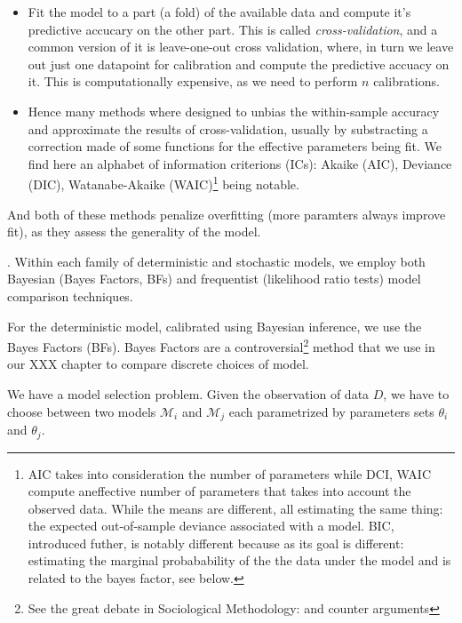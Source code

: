 \begin{itemize}
	\item Fit the model to a part (a fold) of the available data and compute it’s predictive accucary on the other part. This is called \emph{cross-validation}, and a common version of it is leave-one-out cross validation, where, in turn we leave out just one datapoint for calibration and compute the predictive accuacy on it. This is computationally expensive, as we need to perform $n$ calibrations.
	\item Hence many methods where designed to unbias the within-sample accuracy and approximate the results of cross-validation, usually by substracting  a correction made of some functions for the effective parameters being fit. We find here an alphabet of information criterions (ICs):  Akaike (AIC), Deviance  (DIC), Watanabe-Akaike (WAIC)\footnote{AIC takes into consideration the number of parameters while DCI, WAIC compute aneffective number of parameters that takes into account the observed data. While the means are different,  all estimating the same thing: the expected out-of-sample deviance associated with a model. BIC, introduced futher, is notably different because as its goal is different: estimating the marginal probabability of the the data under the model and is related to the bayes factor, see below.} being notable.
\end{itemize}
And both of these methods penalize overfitting (more paramters always improve fit), as they assess the generality of the model.




. Within each family of deterministic and stochastic models, we employ both Bayesian (Bayes Factors, BFs) and frequentist (likelihood ratio tests) model comparison techniques. 

For the deterministic model, calibrated using Bayesian inference, we use the Bayes Factors (BFs). Bayes Factors are a controversial\footnote{See the great debate in Sociological Methodology: and counter arguments} method that we use in our XXX chapter to compare discrete choices of model.

We have a model selection problem. Given the observation of data $D$, we have to choose between two models $\mathcal{M}_i$ and $\mathcal{M}_j$ each parametrized by parameters sets $\theta_i$ and $\theta_j$.

